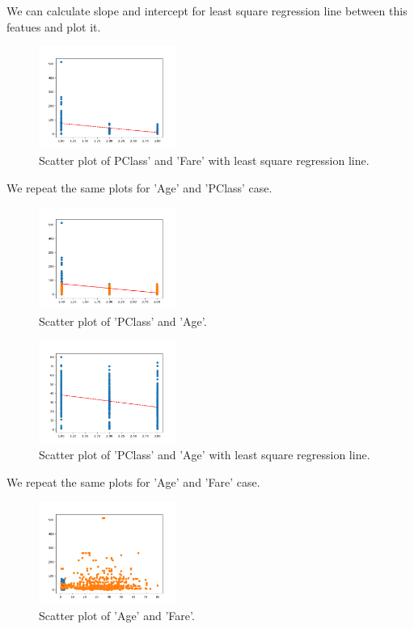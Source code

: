 \documentclass[12pt]{article}
\begin{document}
We can calculate slope and intercept for least square regression line between this featues and plot it.

\begin{figure}[ht!]
    \centering
    \includegraphics[width=0.4\textwidth]{figs/figure_4.png}
    \caption{Scatter plot of PClass' and 'Fare' with least square regression line.}
\end{figure}

We repeat the same plots for 'Age' and 'PClass' case.

\begin{figure}[ht!]
    \centering
    \includegraphics[width=0.4\textwidth]{figs/figure_5.png}
    \caption{Scatter plot of 'PClass' and 'Age'.}
\end{figure}
 
\begin{figure}[ht!]
    \centering
    \includegraphics[width=0.4\textwidth]{figs/figure_6.png}
    \caption{Scatter plot of 'PClass' and 'Age' with least square regression line.}
\end{figure}

We repeat the same plots for 'Age' and 'Fare' case.

\begin{figure}[ht!]
    \centering
    \includegraphics[width=0.4\textwidth]{figs/figure_7.png}
    \caption{Scatter plot of 'Age' and 'Fare'.}
\end{figure}
\end{document}
